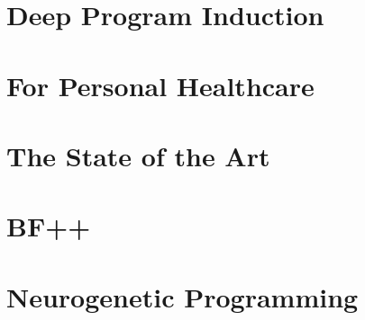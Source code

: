 \usepackage{lipsum}




\coverpage{\TITLE}{\SUBTITLE}{\AUTHOR}{\DATE}{\SUBJECT}

\newpage



\tableofcontents

\listoffigures

\listoftables


\printnomenclature

\newpage
\chapter{Deep Program Induction} \label{ch:autocode-motiv}


\newpage
\chapter{For Personal Healthcare}


\newpage
\chapter{The State of the Art}\label{ch:autocode-sota}


\newpage
\chapter{BF++}\label{ch:bfpp}


\newpage
\chapter{Neurogenetic Programming}\label{ch:neurogen}


